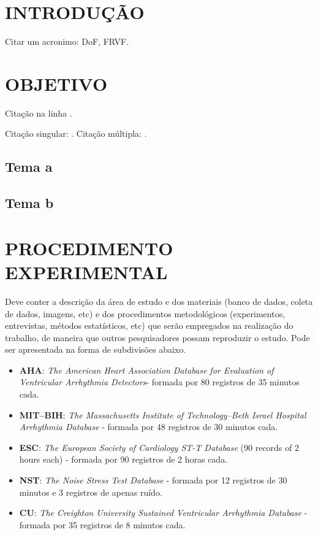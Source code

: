 \chapter{INTRODUÇÃO}
\label{chap:introduction}

Citar um acronimo: \ac{DoF}, \ac{FRVF}.

\lipsum[1-2]

\chapter{OBJETIVO}
\label{chap:objetive}

Citação na linha .

Citação singular: \cite{earnshaw2014virtual}. Citação múltipla: \cite{azuma1997survey, earnshaw2014virtual}.

\section{Tema a}

\lipsum[1]

\section{Tema b}

\lipsum[1]

\chapter{PROCEDIMENTO EXPERIMENTAL} 
\label{chap:methodology}

Deve conter a descrição da área de estudo e dos materiais (banco de dados, coleta de dados, imagens, etc) e dos procedimentos metodológicos (experimentos, entrevistas, métodos estatísticos, etc) que serão empregados na realização do trabalho, de maneira que outros pesquisadores possam reproduzir o estudo. Pode ser apresentada na forma de subdivisões abaixo.

\begin{itemize}
    \item \large \textbf{AHA}: \large \textit{The American Heart Association Database for Evaluation of Ventricular Arrhythmia Detectors}- formada por 80 registros de 35 minutos cada.
    \item \large \textbf{MIT–BIH}: \large \textit{The Massachusetts Institute of Technology–Beth Israel Hospital Arrhythmia Database} - formada por 48 registros de 30 minutos cada.
    \item \large \textbf{ESC}: \large \textit{The European Society of Cardiology ST-T Database} (90 records of 2 hours each) - formada por 90 registros de 2 horas cada.
    \item \large \textbf{NST}: \large \textit{The Noise Stress Test Database} - formada por 12 registros de 30 minutos e 3 registros de apenas ruído.
    \item \large \textbf{CU}: \large \textit{The Creighton University Sustained Ventricular Arrhythmia Database} - formada por 35 registros de 8 minutos cada.
\end{itemize}

